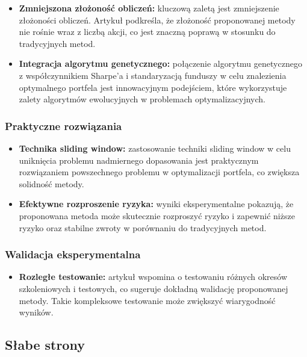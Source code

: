 \documentclass[polish,envcountsect,10pt]{article}
\begin{document}
\begin{itemize}
	\item \textbf{Zmniejszona złożoność obliczeń:}
    kluczową zaletą jest zmniejszenie złożoności obliczeń. Artykuł podkreśla, że złożoność proponowanej metody nie rośnie wraz z liczbą akcji, co jest znaczną poprawą w stosunku do tradycyjnych metod.
	\item \textbf{Integracja algorytmu genetycznego:}
    połączenie algorytmu genetycznego z współczynnikiem Sharpe’a i standaryzacją funduszy w celu znalezienia optymalnego portfela jest innowacyjnym podejściem, które wykorzystuje zalety algorytmów ewolucyjnych w problemach optymalizacyjnych.
\end{itemize}

\subsubsection{Praktyczne rozwiązania}

\begin{itemize}
	\item \textbf{Technika sliding window:}
    zastosowanie techniki sliding window w celu uniknięcia problemu nadmiernego dopasowania jest praktycznym rozwiązaniem powszechnego problemu w optymalizacji portfela, co zwiększa solidność metody.
	\item \textbf{Efektywne rozproszenie ryzyka:}
    wyniki eksperymentalne pokazują, że proponowana metoda może skutecznie rozproszyć ryzyko i zapewnić niższe ryzyko oraz stabilne zwroty w porównaniu do tradycyjnych metod.
\end{itemize}

\subsubsection{Walidacja eksperymentalna}

\begin{itemize}
	\item \textbf{Rozległe testowanie:}
    artykuł wspomina o testowaniu różnych okresów szkoleniowych i testowych, co sugeruje dokładną walidację proponowanej metody. Takie kompleksowe testowanie może zwiększyć wiarygodność wyników.
\end{itemize}

\subsection{Słabe strony}
\end{document}
